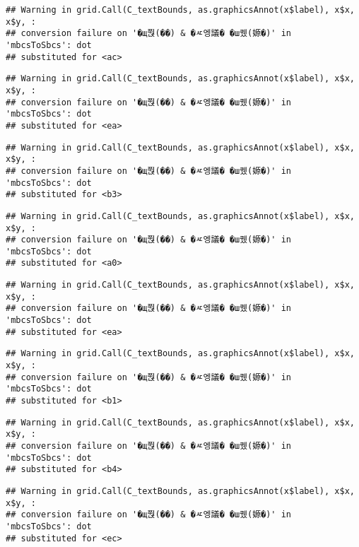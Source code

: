 \documentclass[
]{article}
\begin{document}
\begin{verbatim}
## Warning in grid.Call(C_textBounds, as.graphicsAnnot(x$label), x$x, x$y, :
## conversion failure on '�щ쭩(��) & �ㅼ엥議� �ш퀬(嫄�)' in 'mbcsToSbcs': dot
## substituted for <ac>
\end{verbatim}

\begin{verbatim}
## Warning in grid.Call(C_textBounds, as.graphicsAnnot(x$label), x$x, x$y, :
## conversion failure on '�щ쭩(��) & �ㅼ엥議� �ш퀬(嫄�)' in 'mbcsToSbcs': dot
## substituted for <ea>
\end{verbatim}

\begin{verbatim}
## Warning in grid.Call(C_textBounds, as.graphicsAnnot(x$label), x$x, x$y, :
## conversion failure on '�щ쭩(��) & �ㅼ엥議� �ш퀬(嫄�)' in 'mbcsToSbcs': dot
## substituted for <b3>
\end{verbatim}

\begin{verbatim}
## Warning in grid.Call(C_textBounds, as.graphicsAnnot(x$label), x$x, x$y, :
## conversion failure on '�щ쭩(��) & �ㅼ엥議� �ш퀬(嫄�)' in 'mbcsToSbcs': dot
## substituted for <a0>
\end{verbatim}

\begin{verbatim}
## Warning in grid.Call(C_textBounds, as.graphicsAnnot(x$label), x$x, x$y, :
## conversion failure on '�щ쭩(��) & �ㅼ엥議� �ш퀬(嫄�)' in 'mbcsToSbcs': dot
## substituted for <ea>
\end{verbatim}

\begin{verbatim}
## Warning in grid.Call(C_textBounds, as.graphicsAnnot(x$label), x$x, x$y, :
## conversion failure on '�щ쭩(��) & �ㅼ엥議� �ш퀬(嫄�)' in 'mbcsToSbcs': dot
## substituted for <b1>
\end{verbatim}

\begin{verbatim}
## Warning in grid.Call(C_textBounds, as.graphicsAnnot(x$label), x$x, x$y, :
## conversion failure on '�щ쭩(��) & �ㅼ엥議� �ш퀬(嫄�)' in 'mbcsToSbcs': dot
## substituted for <b4>
\end{verbatim}

\begin{verbatim}
## Warning in grid.Call(C_textBounds, as.graphicsAnnot(x$label), x$x, x$y, :
## conversion failure on '�щ쭩(��) & �ㅼ엥議� �ш퀬(嫄�)' in 'mbcsToSbcs': dot
## substituted for <ec>
\end{verbatim}
\end{document}
